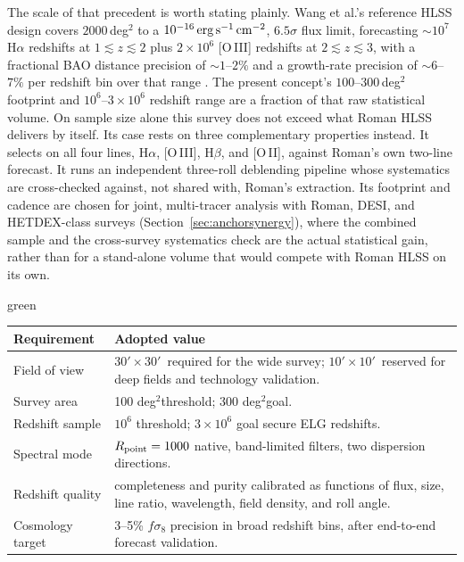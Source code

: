 \documentclass[10pt,onecolumn]{article}
\newcommand{\fsig}{f\sigma_8}
\newcommand{\degti}{deg$^2$}
\newcommand{\fovsmall}{$10'\!\times10'$}
\newcommand{\fovlarge}{$30'\!\times30'$}
\begin{document}
The scale of that precedent is worth stating plainly. Wang et al.'s reference HLSS design covers $2000$\,deg$^2$ to a $10^{-16}\,{\rm erg\,s^{-1}\,cm^{-2}}$, $6.5\sigma$ flux limit, forecasting $\sim10^7$ H$\alpha$ redshifts at $1\lesssim z\lesssim2$ plus $2\times10^6$ [O\,III] redshifts at $2\lesssim z\lesssim3$, with a fractional BAO distance precision of $\sim1$--$2\%$ and a growth-rate precision of $\sim6$--$7\%$ per redshift bin over that range \cite{wang2021}. The present concept's $100$--$300$\,deg$^2$ footprint and $10^6$--$3\times10^6$ redshift range are a fraction of that raw statistical volume. On sample size alone this survey does not exceed what Roman HLSS delivers by itself. Its case rests on three complementary properties instead. It selects on all four lines, H$\alpha$, [O\,III], H$\beta$, and [O\,II], against Roman's own two-line forecast. It runs an independent three-roll deblending pipeline whose systematics are cross-checked against, not shared with, Roman's extraction. Its footprint and cadence are chosen for joint, multi-tracer analysis with Roman, DESI, and HETDEX-class surveys (Section~\ref{sec:anchorsynergy}), where the combined sample and the cross-survey systematics check are the actual statistical gain, rather than for a stand-alone volume that would compete with Roman HLSS on its own.

\begin{leadbox}[title=RSD Survey Definition]{green}
\begin{tabularx}{\textwidth}{@{}p{4.3cm}Y@{}}
\toprule
\textbf{Requirement} & \textbf{Adopted value}\\
\midrule
Field of view & \fovlarge\ required for the wide survey; \fovsmall\ reserved for deep fields and technology validation.\\
Survey area & 100 \degti threshold; 300 \degti goal.\\
Redshift sample & $10^6$ threshold; $3\times10^6$ goal secure ELG redshifts.\\
Spectral mode & $R_{\rm point}=1000$ native, band-limited filters, two dispersion directions.\\
Redshift quality & completeness and purity calibrated as functions of flux, size, line ratio, wavelength, field density, and roll angle.\\
Cosmology target & 3--5\% $\fsig$ precision in broad redshift bins, after end-to-end forecast validation.\\
\bottomrule
\end{tabularx}
\end{leadbox}
\end{document}
